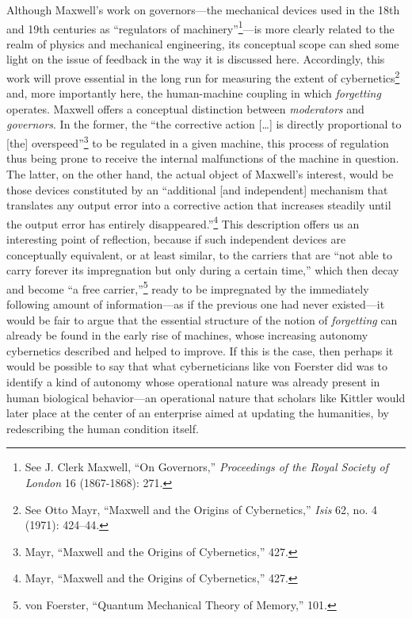 \documentclass{tufte-handout}
\begin{document}
Although Maxwell's work on governors---the mechanical devices used in
the 18th and 19th centuries as ``regulators of
machinery''\footnote{See J. Clerk Maxwell, ``On Governors,''
  \emph{Proceedings of the Royal Society of London} 16 (1867-1868): 271.}---is
more clearly related to the realm of physics and mechanical engineering,
its conceptual scope can shed some light on the issue of feedback in the
way it is discussed here. Accordingly, this work will prove essential in
the long run for measuring the extent of cybernetics\footnote{See Otto
  Mayr, ``Maxwell and the Origins of Cybernetics,'' \emph{Isis} 62, no.
  4 (1971): 424--44.} and, more importantly here, the human-machine
coupling in which \emph{forgetting} operates. Maxwell offers a
conceptual distinction between \emph{moderators} and \emph{governors}.
In the former, the ``the corrective action {[}\ldots{]} is directly
proportional to {[}the{]} overspeed''\footnote{Mayr, ``Maxwell and the
  Origins of Cybernetics,'' 427.} to be regulated in a given machine,
this process of regulation thus being prone to receive the internal
malfunctions of the machine in question. The latter, on the other hand,
the actual object of Maxwell's interest, would be those devices
constituted by an ``additional {[}and independent{]} mechanism that
translates any output error into a corrective action that increases
steadily until the output error has entirely disappeared.''\footnote{Mayr,
  ``Maxwell and the Origins of Cybernetics,'' 427.} This description
offers us an interesting point of reflection, because if such
independent devices are conceptually equivalent, or at least similar, to
the carriers that are ``not able to carry forever its impregnation but
only during a certain time,'' which then decay and become ``a free
carrier,''\footnote{von Foerster, ``Quantum Mechanical Theory of
  Memory,'' 101.} ready to be impregnated by the immediately following
amount of information---as if the previous one had never existed---it
would be fair to argue that the essential structure of the notion of
\emph{forgetting} can already be found in the early rise of machines,
whose increasing autonomy cybernetics described and helped to improve.
If this is the case, then perhaps it would be possible to say that what
cyberneticians like von Foerster did was to identify a kind of autonomy
whose operational nature was already present in human biological
behavior---an operational nature that scholars like Kittler would later
place at the center of an enterprise aimed at updating the humanities,
by redescribing the human condition itself.
\end{document}

